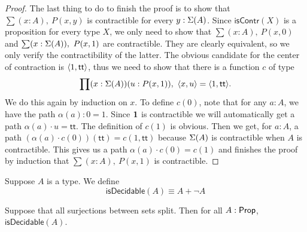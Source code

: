 \begin{proof}
The last thing to do to finish the proof is to show that 
$\sum(x:A),\ P(x,y)$ is contractible for every $y:\Sigma(A)$. 
Since $\mathsf{isContr}(X)$ is a proposition for every type $X$, 
we only need to show that $\sum(x:A),\ P(x,0)$ and 
$\sum(x:\Sigma(A)),\ P(x,1)$ are contractible. 
They are clearly equivalent, so we only verify the contractibility 
of the latter. The obvious candidate for the center of contraction 
is ${\langle 1,\mathsf{tt}\rangle}$, thus we need to show that there is a 
function $c$ of type
\begin{equation*}
\prod(x:\susp(A))(u:P(x,1)),\ \langle{x,u}\rangle=\langle{1,\mathsf{tt}}\rangle.
\end{equation*}
We do this again by induction on $x$. To define $c(0)$, note that 
for any $a:A$, we have the path $\alpha(a):0= 1$. Since 
$\mathbf{1}$ is contractible we will automatically get a path 
$\alpha(a)\cdot u=\mathsf{tt}$. The definition of $c(1)$ is obvious. 
Then we get, for $a:A$, a path 
$(\alpha(a)\cdot c(0))(\mathsf{tt})= c(1,\mathsf{tt})$ 
because $\Sigma(A)$ is contractible when $A$ is contractible. 
This gives us a path $\alpha(a)\cdot c(0)= c(1)$ and finishes 
the proof by induction that $\sum(x:A),\ P(x,1)$ is contractible.
\end{proof}

\begin{defn}
Suppose $A$ is a type. We define
\begin{equation*}
\mathsf{isDecidable}(A)\equiv  A+\neg A
\end{equation*}
\end{defn}

\begin{thm}\label{thm:1surj_to_surj_to_pem}
Suppose that all surjections between sets split. Then for all $A:\mathsf{Prop}$,
$\mathsf{isDecidable}(A)$. 
\end{thm}


